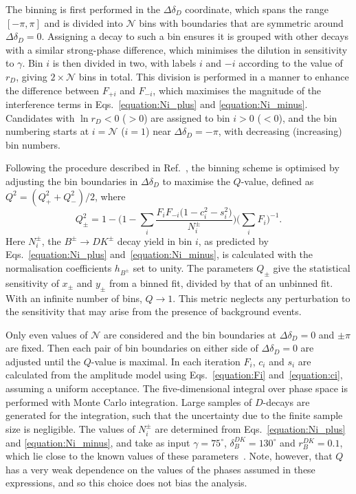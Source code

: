 \documentclass[12pt, a4paper, notitlepage, onecolumn]{article}
\begin{document}
The binning is first performed in the $\Delta\delta_D$ coordinate, which spans the range $[-\pi, \pi]$ and is divided into $\mathcal{N}$ bins with boundaries that are symmetric around $\Delta\delta_D=0$. Assigning a decay to such a bin ensures it is grouped with other decays with a similar strong-phase difference, which minimises the dilution in sensitivity to $\gamma$. Bin $i$ is then divided in two, with labels $i$ and $-i$ according to the value of $r_{D}$, giving $2 \times {\mathcal N}$ bins in total. This division is performed in a manner to enhance the difference between $F_{+i}$ and $F_{-i}$, which maximises the magnitude of the interference terms in Eqs.~\eqref{equation:Ni_plus} and \eqref{equation:Ni_minus}. Candidates with $\ln r_D < 0$ ($> 0$) are assigned to bin $i > 0$ ($< 0$), and the bin numbering starts at $i = \mathcal{N}$ ($i = 1$) near $\Delta\delta_D = -\pi$, with decreasing (increasing) bin numbers.

Following the procedure described in Ref.~\cite{HarnewS4pi}, the binning scheme is optimised by adjusting the bin boundaries in $\Delta \delta_D$ to maximise the $Q$-value, 
 defined as $Q^2 = (Q_+^2 + Q_-^2)/2$, where
\begin{equation}
    Q_\pm^2 = 1 - \Big(1 - \sum_i\frac{F_iF_{-i}\big(1 - c_i^2 - s_i^2\big)}{N_{i}^\pm}\Big)\Big(\sum_iF_i\Big)^{-1}.
    \label{equation:Qvalue}
\end{equation}
Here $N_i^\pm$, the $B^\pm \to DK^\pm$ decay yield in bin $i$, as predicted by Eqs.~\eqref{equation:Ni_plus} and~\eqref{equation:Ni_minus}, is calculated with the normalisation coefficients $h_{B^\pm}$ set to unity. The parameters $Q_{\pm}$ give the statistical sensitivity of $x_\pm$ and $y_\pm$ from a binned fit, divided by that of an unbinned fit. With an infinite number of bins, $Q\to 1$. This metric neglects any perturbation to the sensitivity that may arise from the presence of background events.

Only even values of $\mathcal{N}$ are considered and the bin boundaries at $\Delta\delta_D = 0$ and $\pm\pi$ are fixed. Then each pair of bin boundaries on either side of $\Delta\delta_D = 0$ are adjusted until the $Q$-value is maximal. In each iteration $F_i$, $c_i$ and $s_i$  are calculated from the amplitude model using Eqs.~\eqref{equation:Fi} and~\eqref{equation:ci}, assuming a uniform acceptance. The five-dimensional integral over phase space is performed with Monte Carlo integration. Large samples of $D$-decays are generated for the integration, such that the uncertainty due to the finite sample size is negligible. The values of $N_i^\pm$ are determined from Eqs.~\eqref{equation:Ni_plus} and \eqref{equation:Ni_minus}, and take as input $\gamma = 75^\circ$, $\delta^{DK}_B = 130^\circ$ and $r^{DK}_B = 0.1$, which lie close to the known values of these parameters~\cite{LHCb-PAPER-2021-033}. Note, however, that $Q$ has a very weak dependence on the values of the phases assumed in these expressions, and so this choice does not bias the analysis.
\end{document}
